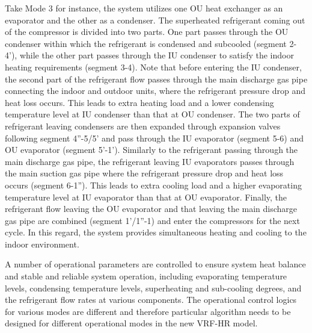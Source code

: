 Take Mode 3 for instance, the system utilizes one OU heat exchanger as an evaporator and the other as a condenser. The superheated refrigerant coming out of the compressor is divided into two parts. One part passes through the OU condenser within which the refrigerant is condensed and subcooled (segment 2-4’), while the other part passes through the IU condenser to satisfy the indoor heating requirements (segment 3-4). Note that before entering the IU condenser, the second part of the refrigerant flow passes through the main discharge gas pipe connecting the indoor and outdoor units, where the refrigerant pressure drop and heat loss occurs. This leads to extra heating load and a lower condensing temperature level at IU condenser than that at OU condenser. The two parts of refrigerant leaving condensers are then expanded through expansion valves following segment 4”-5/5’ and pass through the IU evaporator (segment 5-6) and OU evaporator (segment 5’-1’). Similarly to the refrigerant passing through the main discharge gas pipe, the refrigerant leaving IU evaporators passes through the main suction gas pipe where the refrigerant pressure drop and heat loss occurs (segment 6-1”). This leads to extra cooling load and a higher evaporating temperature level at IU evaporator than that at OU evaporator. Finally, the refrigerant flow leaving the OU evaporator and that leaving the main discharge gas pipe are combined (segment 1’/1”-1) and enter the compressors for the next cycle. In this regard, the system provides simultaneous heating and cooling to the indoor environment.

A number of operational parameters are controlled to ensure system heat balance and stable and reliable system operation, including evaporating temperature levels, condensing temperature levels, superheating and sub-cooling degrees, and the refrigerant flow rates at various components. The operational control logics for various modes are different and therefore particular algorithm needs to be designed for different operational modes in the new VRF-HR model.

